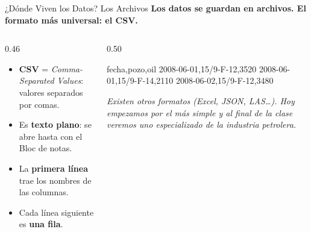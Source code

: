 \documentclass[aspectratio=169, 11pt]{beamer}
\begin{document}
\begin{frame}[fragile,shrink=10]{¿Dónde Viven los Datos? Los Archivos}
  \vspace{-4pt}
  {\small\color{arcaDark}\bfseries
    Los datos se guardan en archivos. El formato más universal: el \textbf{CSV}.}

  \vspace{6pt}
  \begin{columns}[T]
    \begin{column}{0.46\textwidth}
      {\footnotesize\color{textMuted}
      \begin{itemize}\setlength{\itemsep}{5pt}
        \item[{\color{arcaRed}\scriptsize\faFile}]
          \textbf{CSV} = \textit{Comma-Separated Values}:
          valores separados por comas.
        \item[{\color{arcaRed}\scriptsize\faFont}]
          Es \textbf{texto plano}: se abre hasta con
          el Bloc de notas.
        \item[{\color{arcaRed}\scriptsize\faFont}]
          La \textbf{primera línea} trae los nombres
          de las columnas.
        \item[{\color{arcaRed}\scriptsize\faList}]
          Cada línea siguiente es \textbf{una fila}.
      \end{itemize}
      }
    \end{column}

    \begin{column}{0.50\textwidth}
      \begin{outputblock}[title={\small\faFile\hspace{6pt}produccion.csv (por dentro)}]
fecha,pozo,oil
2008-06-01,15/9-F-12,3520
2008-06-01,15/9-F-14,2110
2008-06-02,15/9-F-12,3480
      \end{outputblock}

      \vspace{4pt}
      {\scriptsize\color{textMuted}\itshape
        Existen otros formatos (Excel, JSON, LAS\ldots).
        Hoy empezamos por el más simple y al final
        de la clase veremos uno especializado
        de la industria petrolera.}
    \end{column}
  \end{columns}
\end{frame}
\end{document}
